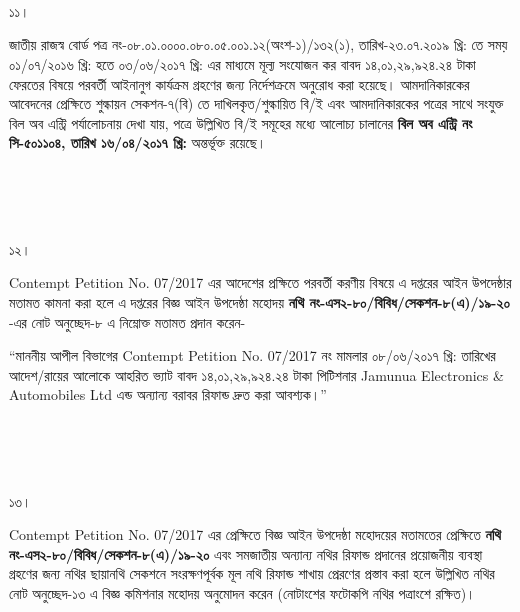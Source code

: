 \documentclass[12pt]{article}
\begin{document}
\\
\\
\\
\begin{minipage}[t]{0.05\linewidth}
১১।
\end{minipage}
\begin{minipage}[t]{1\linewidth}
জাতীয় রাজস্ব বোর্ড পত্র
নং-০৮.০১.০০০০.০৮০.০৫.০০১.১২(অংশ-১)/১৩২(১),
তারিখ-২৩.০৭.২০১৯ খ্রি:
তে সময়
০১/০৭/২০১৬ খ্রি: হতে ০৩/০৬/২০১৭ খ্রি:
এর মাধ্যমে মূল্য সংযোজন কর বাবদ
১৪,০১,২৯,৯২৪.২৪ টাকা
ফেরতের বিষয়ে পরবর্তী
আইনানুগ কার্যক্রম গ্রহণের জন্য
নির্দেশক্রমে অনুরোধ করা হয়েছে।
আমদানিকারকের আবেদনের প্রেক্ষিতে শুল্কায়ন
সেকশন-৭(বি) তে দাখিলকৃত/শুল্কায়িত
বি/ই এবং আমদানিকারকের
পত্রের সাথে সংযুক্ত বিল অব এন্ট্রি
পর্যালোচনায় দেখা যায়,
পত্রে উল্লিখিত বি/ই সমূহের
মধ্যে আলোচ্য চালানের
\textbf{বিল অব এন্ট্রি নং সি-৫০১১০৪, তারিখ ১৬/০৪/২০১৭ খ্রি:}
অন্তর্ভূক্ত রয়েছে।
\end{minipage}
\\
\\
\\
\begin{minipage}[t]{0.05\linewidth}
১২।
\end{minipage}
\begin{minipage}[t]{1\linewidth}
Contempt Petition No. 07/2017
এর আদেশের প্রক্ষিতে পরবর্তী
করণীয় বিষয়ে এ দপ্তরের আইন
উপদেষ্ঠার মতামত কামনা করা হলে এ দপ্তরের
বিজ্ঞ আইন উপদেষ্ঠা মহোদয়
\textbf{নথি নং-এস২-৮০/বিবিধ/সেকশন-৮(এ)/১৯-২০}
-এর নোট অনুচ্ছেদ-৮ এ নিম্নোক্ত মতামত প্রদান করেন-


\hspace{1em}``মাননীয় আপীল বিভাগের
Contempt Petition No. 07/2017
নং মামলার ০৮/০৬/২০১৭ খ্রি: তারিখের
আদেশ/রায়ের আলোকে আহরিত ভ্যাট বাবদ
১৪,০১,২৯,৯২৪.২৪ টাকা
পিটিশনার
Jamunua Electronics \& Automobiles Ltd
এন্ড অন্যান্য বরাবর রিফান্ড
দ্রুত করা আবশ্যক।''
\end{minipage}
\\
\\
\\
\begin{minipage}[t]{0.05\linewidth}
১৩।
\end{minipage}
\begin{minipage}[t]{1\linewidth}
Contempt Petition No. 07/2017
এর প্রেক্ষিতে বিজ্ঞ আইন উপদেষ্ঠা মহোদয়ের
মতামতের প্রেক্ষিতে
\textbf{নথি নং-এস২-৮০/বিবিধ/সেকশন-৮(এ)/১৯-২০}
এবং সমজাতীয় অন্যান্য নথির
রিফান্ড প্রদানের প্রয়োজনীয় ব্যবস্থা গ্রহণের
জন্য নথির ছায়ানথি সেকশনে
সংরক্ষণপূর্বক মূল নথি রিফান্ড
শাখায় প্রেরণের প্রস্তাব করা হলে উল্লিখিত নথির
নোট অনুচ্ছেদ-১৩ এ বিজ্ঞ কমিশনার মহোদয় অনুমোদন
করেন (নোটাংশের ফটোকপি নথির পত্রাংশে রক্ষিত)।
\end{minipage}
\end{document}
